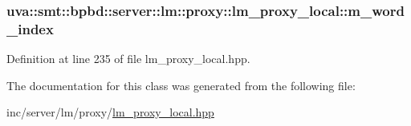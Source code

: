 \subsubsection[{m\+\_\+word\+\_\+index}]{ uva\+::smt\+::bpbd\+::server\+::lm\+::proxy\+::lm\+\_\+proxy\+\_\+local\+::m\+\_\+word\+\_\+index\hspace{0.3cm}{\ttfamily [protected]}}\label{classuva_1_1smt_1_1bpbd_1_1server_1_1lm_1_1proxy_1_1lm__proxy__local_a52e51098548cbedd08af9b5b6fc897c8}


Definition at line 235 of file lm\+\_\+proxy\+\_\+local.\+hpp.



The documentation for this class was generated from the following file\+:\begin{DoxyCompactItemize}
\item 
inc/server/lm/proxy/\hyperlink{lm__proxy__local_8hpp}{lm\+\_\+proxy\+\_\+local.\+hpp}\end{DoxyCompactItemize}
